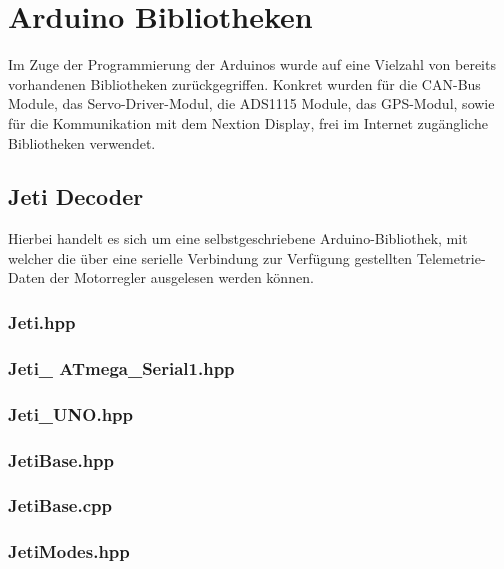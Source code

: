 \section{Arduino Bibliotheken}
Im Zuge der Programmierung der Arduinos wurde auf eine Vielzahl von bereits vorhandenen Bibliotheken zurückgegriffen. Konkret wurden für die CAN-Bus Module\textsuperscript{\cite{ArduinoBibliothekCANBus}}, 
das Servo-Driver-Modul\textsuperscript{\cite{ArduinoBibliothekServoPWM}}, 
die ADS1115 Module\textsuperscript{\cite{ArduinoBibliothekADS1115}},
das GPS-Modul\textsuperscript{\cite{ArduinoBibliothekGPS}},
sowie für die Kommunikation mit dem Nextion Display\textsuperscript{\cite{ArduinoBibliothekNextion}}, frei im Internet zugängliche Bibliotheken verwendet.
\subsection{Jeti Decoder}
Hierbei handelt es sich um eine selbstgeschriebene Arduino-Bibliothek, mit welcher die über eine serielle Verbindung zur Verfügung gestellten Telemetrie-Daten der Motorregler ausgelesen werden können.
\subsubsection{Jeti.hpp}

\subsubsection{Jeti\_ ATmega\_Serial1.hpp}

\subsubsection{Jeti\_UNO.hpp}

\subsubsection{JetiBase.hpp}

\subsubsection{JetiBase.cpp}


\subsubsection{JetiModes.hpp}
